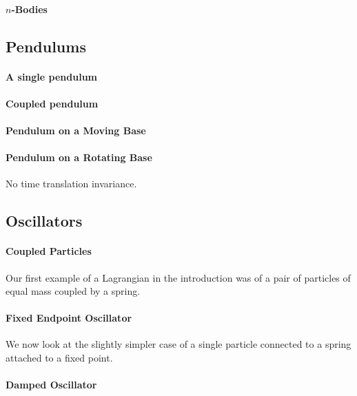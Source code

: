 \documentclass[preprint]{sigplanconf}
\theoremstyle{examplestyle}
\begin{document}
\paragraph{$n$-Bodies}

\subsection{Pendulums}

\paragraph{A single pendulum}

\paragraph{Coupled pendulum}

\paragraph{Pendulum on a Moving Base}

\paragraph{Pendulum on a Rotating Base}

No time translation invariance.

\subsection{Oscillators}

\paragraph{Coupled Particles} Our first example of a Lagrangian in the
introduction was of a pair of particles of equal mass coupled by a
spring.

\paragraph{Fixed Endpoint Oscillator} We now look at the slightly
simpler case of a single particle connected to a spring attached to a
fixed point.

\paragraph{Damped Oscillator}
\end{document}
